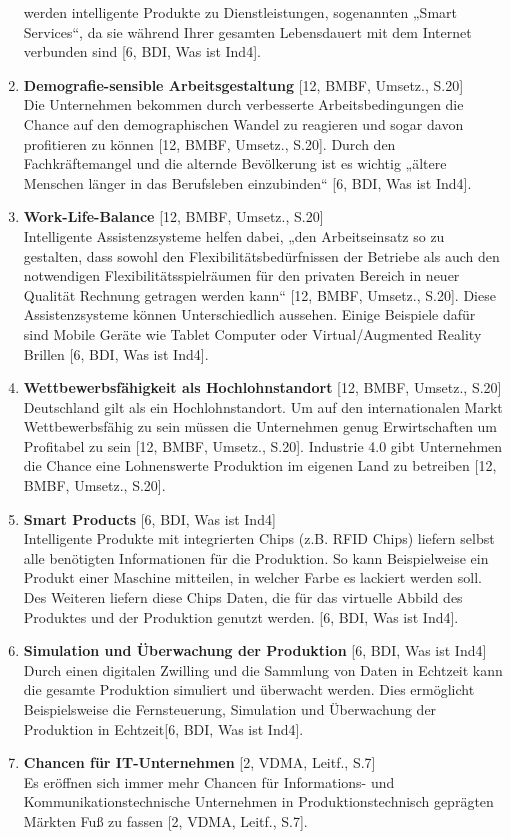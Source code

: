 \begin{enumerate}
	werden intelligente Produkte zu Dienstleistungen, sogenannten „Smart Services“, da sie 
	während Ihrer gesamten Lebensdauert mit dem Internet verbunden sind [6, BDI, Was ist 
	Ind4].
	\item \textbf{Demografie-sensible Arbeitsgestaltung} [12, BMBF, Umsetz., S.20] \\
	Die Unternehmen bekommen durch verbesserte Arbeitsbedingungen die Chance auf den 
	demographischen Wandel zu reagieren und sogar davon profitieren zu können [12, BMBF, 
	Umsetz., S.20]. Durch den Fachkräftemangel und die alternde Bevölkerung ist es wichtig 
	„ältere Menschen länger in das Berufsleben einzubinden“ [6, BDI, Was ist Ind4].
	\item \textbf{Work-Life-Balance} [12, BMBF, Umsetz., S.20] \\
	Intelligente Assistenzsysteme helfen dabei, „den Arbeitseinsatz so zu gestalten, dass sowohl
	den Flexibilitätsbedürfnissen der Betriebe als auch den notwendigen Flexibilitätsspielräumen
	für den privaten Bereich in neuer Qualität Rechnung getragen werden kann“ [12, BMBF, 
	Umsetz., S.20]. Diese Assistenzsysteme können Unterschiedlich aussehen. Einige Beispiele
	dafür sind Mobile Geräte wie Tablet Computer oder Virtual/Augmented Reality Brillen [6, 
	BDI, Was ist Ind4].
	\item \textbf{Wettbewerbsfähigkeit als Hochlohnstandort} [12, BMBF, Umsetz., S.20] \\
	Deutschland gilt als ein Hochlohnstandort. Um auf den internationalen Markt 
	Wettbewerbsfähig zu sein müssen die Unternehmen genug Erwirtschaften um Profitabel
	zu sein [12, BMBF, Umsetz., S.20]. Industrie 4.0 gibt Unternehmen die Chance eine 
	Lohnenswerte Produktion im eigenen Land zu betreiben [12, BMBF, Umsetz., S.20].
	\item \textbf{Smart Products} [6, BDI, Was ist Ind4] \\
	Intelligente Produkte mit integrierten Chips (z.B. RFID Chips) liefern selbst alle benötigten
	Informationen für die Produktion. So kann Beispielweise ein Produkt einer Maschine 
	mitteilen, in welcher Farbe es lackiert werden soll. Des Weiteren liefern diese Chips Daten, 
	die für das virtuelle Abbild des Produktes und der Produktion genutzt werden. [6, BDI, Was 
	ist Ind4].
	\item \textbf{Simulation und Überwachung der Produktion} [6, BDI, Was ist Ind4] \\
	Durch einen digitalen Zwilling und die Sammlung von Daten in Echtzeit kann die gesamte
	Produktion simuliert und überwacht werden. Dies ermöglicht Beispielsweise die
	Fernsteuerung, Simulation und Überwachung der Produktion in Echtzeit[6, BDI, Was ist Ind4].
	\item \textbf{Chancen für IT-Unternehmen} [2, VDMA, Leitf., S.7] \\
	Es eröffnen sich immer mehr Chancen für Informations- und Kommunikationstechnische
	Unternehmen in Produktionstechnisch geprägten Märkten Fuß zu fassen [2, VDMA, Leitf., 
	S.7].
\end{enumerate}

